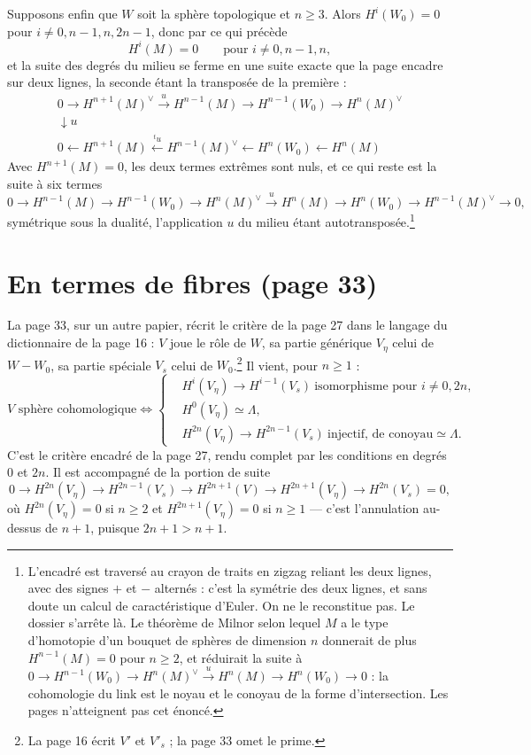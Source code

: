 \documentclass[11pt,a4paper]{article}
\begin{document}
Supposons enfin que $W$ soit la sphère topologique et $n \geq 3$. Alors
$H^{i}(W_0) = 0$ pour $i \neq 0, n-1, n, 2n-1$, donc par ce qui précède
\[
  H^{i}(M) = 0 \qquad \text{pour } i \neq 0, n-1, n,
\]
et la suite des degrés du milieu se ferme en une suite exacte que la page
encadre sur deux lignes, la seconde étant la transposée de la première :
\[
  \boxed{\begin{array}{c}
    0 \to H^{n+1}(M)^{\vee} \xrightarrow{\ u\ } H^{n-1}(M) \to H^{n-1}(W_0)
      \to H^{n}(M)^{\vee} \\
    \downarrow u \\
    0 \leftarrow H^{n+1}(M) \xleftarrow{\ {}^{t}u\ } H^{n-1}(M)^{\vee}
      \leftarrow H^{n}(W_0) \leftarrow H^{n}(M)
  \end{array}}
\]
Avec $H^{n+1}(M) = 0$, les deux termes extrêmes sont nuls, et ce qui reste est
la suite à six termes
\[
  0 \to H^{n-1}(M) \to H^{n-1}(W_0) \to H^{n}(M)^{\vee} \xrightarrow{\ u\ }
  H^{n}(M) \to H^{n}(W_0) \to H^{n-1}(M)^{\vee} \to 0,
\]
symétrique sous la dualité, l'application $u$ du milieu étant
autotransposée.\footnote{L'encadré est traversé au crayon de traits en zigzag
reliant les deux lignes, avec des signes $+$ et $-$ alternés : c'est la
symétrie des deux lignes, et sans doute un calcul de caractéristique
d'Euler. On ne le reconstitue pas. Le dossier s'arrête là. Le théorème de
Milnor selon lequel $M$ a le type d'homotopie d'un bouquet de sphères de
dimension $n$ donnerait de plus $H^{n-1}(M) = 0$ pour $n \geq 2$, et
réduirait la suite à $0 \to H^{n-1}(W_0) \to H^{n}(M)^{\vee}
\xrightarrow{u} H^{n}(M) \to H^{n}(W_0) \to 0$ : la cohomologie du link est le
noyau et le conoyau de la forme d'intersection. Les pages n'atteignent pas cet
énoncé.}

\section*{En termes de fibres (page 33)}

La page 33, sur un autre papier, récrit le critère de la page 27 dans le
langage du dictionnaire de la page 16 : $V$ joue le rôle de $W$, sa partie
générique $V_{\eta}$ celui de $W - W_0$, sa partie spéciale $V_{s}$ celui de
$W_0$.\footnote{La page 16 écrit $V'$ et $V'_{s}$ ; la page 33 omet le prime.}
Il vient, pour $n \geq 1$ :
\[
  V \text{ sphère cohomologique} \iff
  \left\{\begin{aligned}
    &H^{i}(V_{\eta}) \to H^{i-1}(V_{s}) \ \text{isomorphisme pour } i \neq 0, 2n, \\
    &H^{0}(V_{\eta}) \simeq \Lambda, \\
    &H^{2n}(V_{\eta}) \to H^{2n-1}(V_{s}) \ \text{injectif, de conoyau} \simeq \Lambda .
  \end{aligned}\right.
\]
C'est le critère encadré de la page 27, rendu complet par les conditions en
degrés $0$ et $2n$. Il est accompagné de la portion de suite
\[
  0 \to H^{2n}(V_{\eta}) \to H^{2n-1}(V_{s}) \to H^{2n+1}(V) \to
  H^{2n+1}(V_{\eta}) \to H^{2n}(V_{s}) = 0,
\]
où $H^{2n}(V_{\eta}) = 0$ si $n \geq 2$ et $H^{2n+1}(V_{\eta}) = 0$ si
$n \geq 1$ — c'est l'annulation au-dessus de $n+1$, puisque $2n+1 > n+1$.
\end{document}
